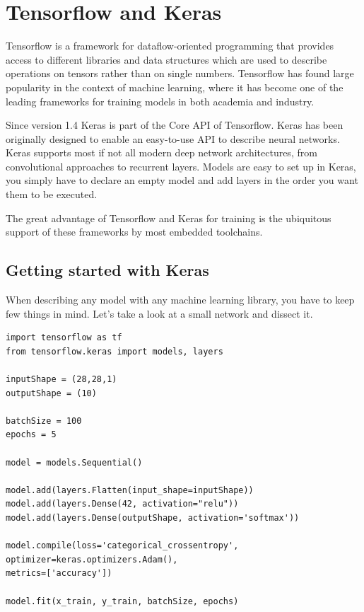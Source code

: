 \documentclass[parskip=half,notes,cadrem,toolver]{iisvlsi}
\begin{document}
\section{Tensorflow and Keras}

Tensorflow is a framework for dataflow-oriented programming that provides access to different libraries and data structures which are used to describe operations on tensors rather than on single numbers. Tensorflow has found large popularity in the context of machine learning, where it has become one of the leading frameworks for training models in both academia and industry. 

Since version 1.4 Keras is part of the Core API of Tensorflow. Keras has been originally designed to enable an easy-to-use API to describe neural networks. Keras supports most if not all modern deep network architectures, from convolutional approaches to recurrent layers. Models are easy to set up in Keras, you simply have to declare an empty model and add layers in the order you want them to be executed.

The great advantage of Tensorflow and Keras for training is the ubiquitous support of these frameworks by most embedded toolchains.


\subsection{Getting started with Keras}

When describing any model with any machine learning library, you have to keep few things in mind. Let's take a look at a small network and dissect it.

\begin{lstlisting}
import tensorflow as tf
from tensorflow.keras import models, layers

inputShape = (28,28,1)
outputShape = (10)

batchSize = 100
epochs = 5

model = models.Sequential()

model.add(layers.Flatten(input_shape=inputShape))
model.add(layers.Dense(42, activation="relu"))
model.add(layers.Dense(outputShape, activation='softmax'))

model.compile(loss='categorical_crossentropy', 
optimizer=keras.optimizers.Adam(), 
metrics=['accuracy'])

model.fit(x_train, y_train, batchSize, epochs)

\end{lstlisting}
\end{document}

